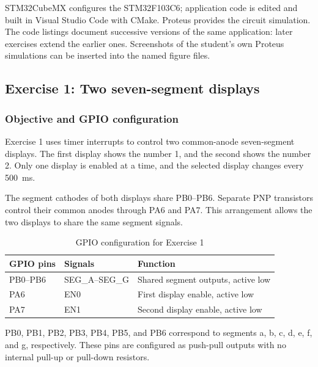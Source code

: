\documentclass[a4paper]{article}
\begin{document}
STM32CubeMX configures the STM32F103C6; application code is edited
and built in Visual Studio Code with CMake. Proteus provides the circuit
simulation. The code listings document successive versions of the same
application: later exercises extend the earlier ones. Screenshots of the
student's own Proteus simulations can be inserted into the named figure files.


\subsection{Exercise 1: Two seven-segment displays}

\subsubsection{Objective and GPIO configuration}

Exercise 1 uses timer interrupts to control two common-anode
seven-segment displays. The first display shows the number 1,
and the second shows the number 2. Only one display is enabled
at a time, and the selected display changes every 500~ms.

The segment cathodes of both displays share PB0--PB6.
Separate PNP transistors control their common anodes through
PA6 and PA7. This arrangement allows the two displays to
share the same segment signals.

\begin{table}[H]
    \centering
    \caption{GPIO configuration for Exercise 1}
    \label{tab:ex01-gpio}
    \begin{tabular}{lll}
        \toprule
        \textbf{GPIO pins} &
        \textbf{Signals} &
        \textbf{Function} \\
        \midrule
        PB0--PB6 &
        SEG\_A--SEG\_G &
        Shared segment outputs, active low \\
        PA6 &
        EN0 &
        First display enable, active low \\
        PA7 &
        EN1 &
        Second display enable, active low \\
        \bottomrule
    \end{tabular}
\end{table}

PB0, PB1, PB2, PB3, PB4, PB5, and PB6 correspond to
segments a, b, c, d, e, f, and g, respectively.
These pins are configured as push-pull outputs with no
internal pull-up or pull-down resistors.
\end{document}
